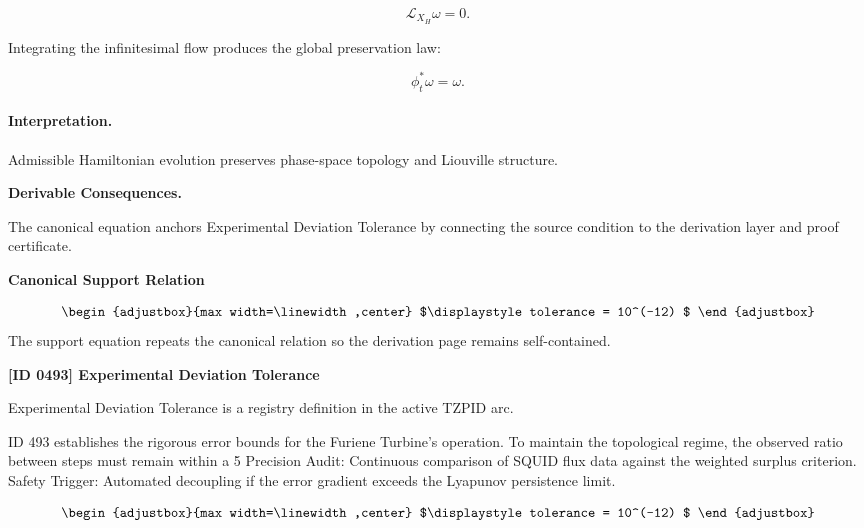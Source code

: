 \begin{equation}
\mathcal{L}_{X_H}\omega=0.
\end{equation}

Integrating the infinitesimal flow produces the global preservation law:

\begin{equation}
\boxed{
\phi_t^{*}\omega=\omega.
}
\end{equation}

\paragraph{Interpretation.}
Admissible Hamiltonian evolution preserves phase-space topology and Liouville structure.

\par\vspace{0.35em}
\noindent\textbf{Derivable Consequences.}\quad
\begingroup
\footnotesize
\raggedright
The canonical equation anchors Experimental Deviation Tolerance by connecting the source condition to the derivation layer and proof certificate.
\par\endgroup

\noindent\textbf{Canonical Support Relation}\par
\[
\begin{adjustbox}{max width=\linewidth,center}
$\displaystyle
tolerance = 10^(-12)
$
\end{adjustbox}
\]
\noindent The support equation repeats the canonical relation so the derivation page remains self-contained.\par

\clearpage
\noindent\textbf{[ID 0493] Experimental Deviation Tolerance}\par
\vspace{0.35em}
\begingroup\small
{}
Experimental Deviation Tolerance is a registry definition in the active TZPID arc.

ID 493 establishes the rigorous error bounds for the Furiene Turbine's operation. To maintain the topological regime, the observed ratio between steps must remain within a 5 Precision Audit: Continuous comparison of SQUID flux data against the weighted surplus criterion. Safety Trigger: Automated decoupling if the error gradient exceeds the Lyapunov persistence limit.

\[
\begin{adjustbox}{max width=\linewidth,center}
$\displaystyle
tolerance = 10^(-12)
$
\end{adjustbox}
\]

